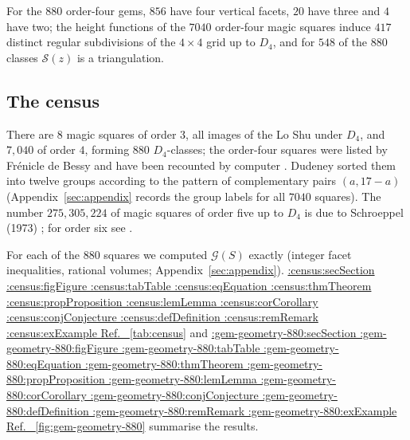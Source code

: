 \documentclass[11pt,a4paper]{article}
\makeatletter
\def\Cref@getprefix#1:#2\relax{#1}
\def\Cref@prefix@sec{sec}
\def\Cref@prefix@fig{fig}
\def\Cref@prefix@tab{tab}
\def\Cref@prefix@eq{eq}
\def\Cref@prefix@thm{thm}
\def\Cref@prefix@prop{prop}
\def\Cref@prefix@lem{lem}
\def\Cref@prefix@cor{cor}
\def\Cref@prefix@conj{conj}
\def\Cref@prefix@def{def}
\def\Cref@prefix@rem{rem}
\def\Cref@prefix@ex{ex}
\def\Cref@type@cap#1{%
  \edef\Cref@tmp{#1}%
  \ifx\Cref@tmp\Cref@prefix@sec Section%
  \else\ifx\Cref@tmp\Cref@prefix@fig Figure%
  \else\ifx\Cref@tmp\Cref@prefix@tab Table%
  \else\ifx\Cref@tmp\Cref@prefix@eq Equation%
  \else\ifx\Cref@tmp\Cref@prefix@thm Theorem%
  \else\ifx\Cref@tmp\Cref@prefix@prop Proposition%
  \else\ifx\Cref@tmp\Cref@prefix@lem Lemma%
  \else\ifx\Cref@tmp\Cref@prefix@cor Corollary%
  \else\ifx\Cref@tmp\Cref@prefix@conj Conjecture%
  \else\ifx\Cref@tmp\Cref@prefix@def Definition%
  \else\ifx\Cref@tmp\Cref@prefix@rem Remark%
  \else\ifx\Cref@tmp\Cref@prefix@ex Example%
  \else Ref.%
  \fi\fi\fi\fi\fi\fi\fi\fi\fi\fi\fi\fi
}
\DeclareRobustCommand{\Cref}[1]{%
  \begingroup
  \edef\Cref@label{#1}%
  \edef\Cref@prefix{\expandafter\Cref@getprefix\Cref@label:\relax}%
  \hyperref[#1]{\Cref@type@cap{\Cref@prefix}~\ref*{#1}}%
  \endgroup
}
\theoremstyle{plain}
\theoremstyle{definition}
\theoremstyle{remark}
\makeatother
\begin{document}
For the $880$ order-four gems, $856$ have four vertical facets, $20$ have three and $4$ have two; the height functions of the $7040$ order-four magic squares induce $417$ distinct regular subdivisions of the $4\times4$ grid up to $D_4$, and for $548$ of the $880$ classes $\mathcal S(z)$ is a triangulation.

\subsection{The census}
\label{sec:census-4}

There are $8$ magic squares of order $3$, all images of the Lo Shu under $D_4$, and $7{,}040$ of order $4$, forming $880$ $D_4$-classes; the order-four squares were listed by Fr\'enicle de Bessy \cite{frenicle1693} and have been recounted by computer \cite{beck2010enumeration}.
Dudeney sorted them into twelve groups according to the pattern of complementary pairs $(a,17-a)$ \cite{dudeney1917amusements} (Appendix~\ref{sec:appendix} records the group labels for all $7040$ squares).
The number $275{,}305{,}224$ of magic squares of order five up to $D_4$ is due to Schroeppel (1973) \cite{gardner1976}; for order six see \cite{pinn1998number,mino2024order6,trump_howmany}.

For each of the $880$ squares we computed $\mathcal G(S)$ exactly (integer facet inequalities, rational volumes; Appendix~\ref{sec:appendix}).
\Cref{tab:census} and \Cref{fig:gem-geometry-880} summarise the results.
\end{document}
